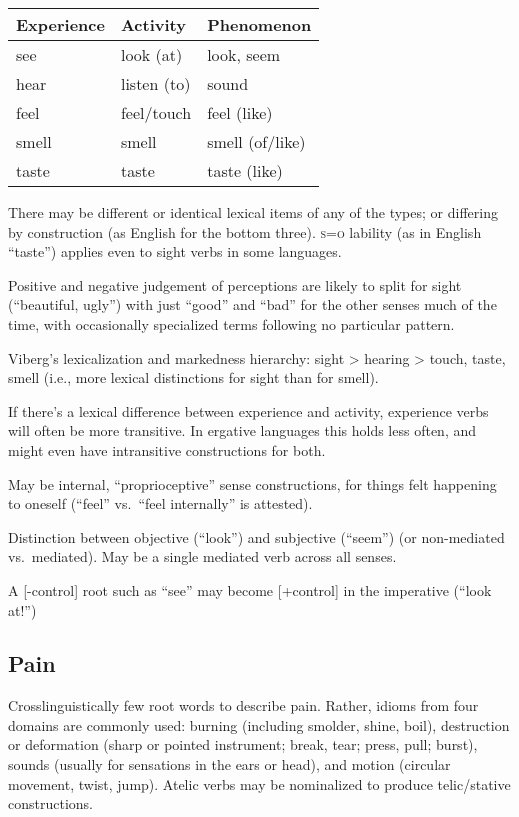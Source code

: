 \documentclass[11pt]{article}
\newcommand{\I}[1]{\textsc{#1}}   %
\begin{document}
\begin{center}
  \begin{tabular}{lll}
    Experience & Activity & Phenomenon \\
    \hline
    see & look (at) & look, seem \\
    hear & listen (to) & sound \\
    feel & feel/touch & feel (like) \\
    smell & smell & smell (of/like) \\
    taste & taste & taste (like)
  \end{tabular}
\end{center}

There may be different or identical lexical items of any of the types;
or differing by construction (as English for the bottom
three).  \I{s=o} lability (as in English ``taste'') applies even to
sight verbs in some languages.

Positive and negative judgement of perceptions are likely to split for
sight (``beautiful, ugly'') with just ``good'' and ``bad'' for the
other senses much of the time, with occasionally specialized terms
following no particular pattern.

Viberg's lexicalization and markedness hierarchy: sight > hearing >
touch, taste, smell (i.e., more lexical distinctions for sight than
for smell).


If there's a lexical difference between experience and activity,
experience verbs will often be more transitive.  In ergative
languages this holds less often, and might even have intransitive
constructions for both.

May be internal, ``proprioceptive'' sense constructions, for things
felt happening to oneself (``feel'' vs.\ ``feel internally'' is
attested). 

Distinction between objective (``look'') and subjective (``seem'') (or
non-mediated vs.\ mediated).  May be a single mediated verb across all
senses.

A [-control] root such as ``see'' may become [+control] in the
imperative (``look at!'')


\subsection{Pain}
Crosslinguistically few root words to describe pain.  Rather, idioms
from four domains are commonly used: burning (including smolder,
shine, boil), destruction or deformation (sharp or pointed instrument;
break, tear; press, pull; burst), sounds (usually for sensations in
the ears or head), and motion (circular movement, twist, jump).
Atelic verbs may be nominalized to produce telic/stative
constructions.
\end{document}
